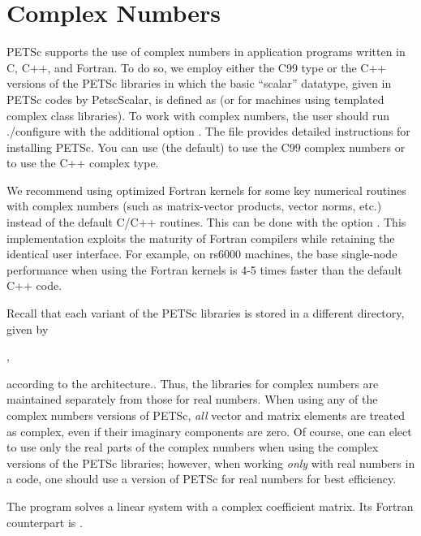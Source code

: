 {{{%
\section{Complex Numbers}  \label{sec_complex}

PETSc supports the use of complex numbers in application programs
written in C, C++, and Fortran.  To do so, we employ either the C99  type or the C++ versions of
the PETSc libraries in which the basic ``scalar'' datatype, given in
PETSc codes by PetscScalar, is defined as  (or  for machines using templated complex class
libraries).  To work with complex numbers,
the user should run ./configure with the additional option .
The file 
provides detailed instructions for installing PETSc. You can use  (the default) to use the C99 complex numbers or  to use the C++ complex type.


We recommend using optimized Fortran kernels for some key numerical
routines with complex numbers (such as matrix-vector products, vector
norms, etc.) instead of the default C/C++ routines.  This can be done with the   option .
This implementation exploits the
maturity of Fortran compilers while retaining the identical user
interface.  For example, on rs6000 machines, the base single-node
performance when using the Fortran kernels is 4-5 times faster than
the default C++ code.


Recall that each variant of the PETSc libraries is stored in a
different directory, given by
\begin{tabbing}
  ,
\end{tabbing}
according to the architecture.. Thus, the
libraries for complex
numbers are maintained separately from those for real
numbers.  When using any of the complex numbers versions of PETSc,
{\em all} vector and matrix elements are treated as complex,
even if their imaginary components are zero.
Of course, one can elect to use only the real parts of the complex
numbers when using the complex versions of the PETSc libraries;
however, when working {\em only} with real numbers in a code,
one should use a version of PETSc for real numbers for best efficiency.

The program 
solves a linear system with a complex
coefficient matrix.  Its Fortran counterpart is
.

}}}
